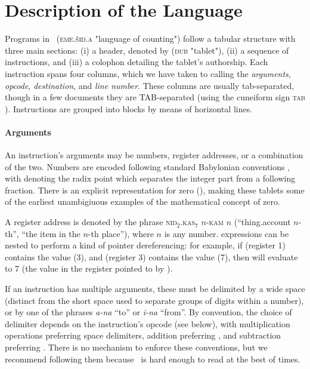 \documentclass[11pt]{article}
\newcommand{\emeszida}{\textcuneiform{𒅴𒋃𒀀}}
\begin{document}
\section{Description of the Language}
Programs in \emeszida\ (\textsc{eme.šid.a} "language of counting") follow a tabular structure with three main sections: (i) a header, denoted by  (\textsc{dub}  "tablet"), (ii) a sequence of instructions, and (iii) a colophon detailing the tablet's authorship.
Each instruction spans four columns, which we have taken to calling the \textit{arguments}, \textit{opcode}, \textit{destination}, and \textit{line number}. 
These columns are usually tab-separated, though in a few documents they are TAB-separated (using the cuneiform sign \textsc{tab} ).
Instructions are grouped into blocks by means of horizontal lines.

\paragraph{Arguments}
An instruction's arguments may be numbers, register addresses, or a combination of the two. Numbers are encoded following standard Babylonian conventions \cite{TODO}, with  denoting the radix point which separates the integer part from a following fraction. There is an explicit representation for zero (), making these tablets some of the earliest unambigiuous examples of the mathematical concept of zero.

A register address is denoted by the phrase \textsc{niŋ$_2$.kas$_7$} $n$-\textsc{kam} $n$ (``thing.account $n$-th'', ``the item in the $n$-th place''), where $n$ is any number.  expressions can be nested to perform a kind of pointer dereferencing: for example, if  (register 1) contains the value  (3), and  (register 3) contains the value  (7), then  will evaluate to 7 (the value in the register pointed to by ).

If an instruction has multiple arguments, these must be delimited by a wide space (distinct from the short space used to separate groups of digits within a number), or by one of the phrases \textit{a-na}  ``to'' or \textit{i-na}  ``from''. By convention, the choice of delimiter depends on the instruction's opcode (see below), with multiplication operations preferring space delimiters, addition preferring , and subtraction preferring . 
There is no mechanism to enforce these conventions, but we recommend following them because \emeszida\ is hard enough to read at the best of times.
\end{document}
